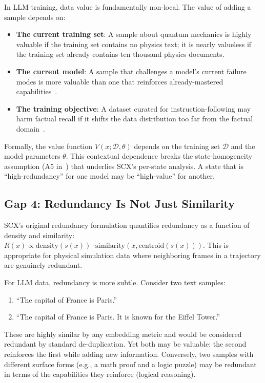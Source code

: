\documentclass[11pt,twocolumn]{article}
\begin{document}
In LLM training, data value is fundamentally non-local. The value of adding a sample depends on:
\begin{itemize}
    \item \textbf{The current training set}: A sample about quantum mechanics is highly valuable if the training set contains no physics text; it is nearly valueless if the training set already contains ten thousand physics documents.
    \item \textbf{The current model}: A sample that challenges a model's current failure modes is more valuable than one that reinforces already-mastered capabilities~\cite{xia2024less,kaplan2024distributed}.
    \item \textbf{The training objective}: A dataset curated for instruction-following may harm factual recall if it shifts the data distribution too far from the factual domain~\cite{mukherjee2023orca}.
\end{itemize}

Formally, the value function $V(x; \mathcal{D}, \theta)$ depends on the training set $\mathcal{D}$ and the model parameters $\theta$. This contextual dependence breaks the state-homogeneity assumption (A5 in~\cite{scx2026}) that underlies SCX's per-state analysis. A state that is ``high-redundancy'' for one model may be ``high-value'' for another.

\subsection{Gap 4: Redundancy Is Not Just Similarity}

SCX's original redundancy formulation quantifies redundancy as a function of density and similarity: $R(x) \propto \text{density}(s(x)) \cdot \text{similarity}(x, \text{centroid}(s(x)))$. This is appropriate for physical simulation data where neighboring frames in a trajectory are genuinely redundant.

For LLM data, redundancy is more subtle. Consider two text samples:
\begin{enumerate}
    \item ``The capital of France is Paris.''
    \item ``The capital of France is Paris. It is known for the Eiffel Tower.''
\end{enumerate}
These are highly similar by any embedding metric and would be considered redundant by standard de-duplication. Yet both may be valuable: the second reinforces the first while adding new information. Conversely, two samples with different surface forms (e.g., a math proof and a logic puzzle) may be redundant in terms of the capabilities they reinforce (logical reasoning).
\end{document}
